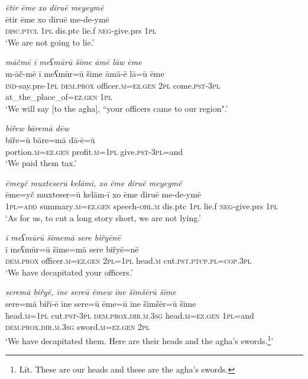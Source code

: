 \ea \label{BP.89}
\textit{ētir ēme xo diruē meyeymē} \\ 
\gll ētir ēme xo diruē me-de-ymē \\ 
 \textsc{disc.ptcl} \textsc{1pl} dis.ptc lie.f \textsc{neg-}give.prs \textsc{1pl} \\ 
\glt `We are not going to lie.'
\z 
 
\ea \label{BP.90}
\textit{māčmē ī meʕmūrū šime āmē lāw ēme} \\ 
\gll m-āč-mē ī meʕmūr=ū šime āmā-ē lā=ū ēme \\ 
 \textsc{ind-}say.prs\textsc{-\textsc{1pl}} \textsc{dem.prox} officer\textsc{.m}\textsc{=ez.gen} \textsc{2pl} come\textsc{.pst}\textsc{-3pl} at\_the\_place\_of\textsc{=ez.gen} \textsc{1pl} \\ 
\glt `We will say [to the agha], “your officers came to our region".'
\z 
 
\ea \label{BP.91}
\textit{biřew bāremā dēw} \\ 
\gll biře=ū bāre=mā dā-ē=ū \\ 
 portion\textsc{.m}\textsc{=ez.gen} profit\textsc{.m}\textsc{=\textsc{1pl}} give\textsc{.pst}\textsc{-3pl}=and \\ 
\glt `We paid them tax.'
\z 
 
\ea \label{BP.95}
\textit{ēmeyč muxteserū kelāmī, xo ēme diruē meyeymē} \\ 
\gll ēme=yč muxteser=ū kelām-ī xo ēme diruē me-de-ymē \\ 
 \textsc{1pl}\textsc{=add} summary\textsc{.m}\textsc{=ez.gen} speech\textsc{-obl}\textsc{.m} dis.ptc \textsc{1pl} lie.f \textsc{neg-}give.prs \textsc{1pl} \\ 
\glt `As for us, to cut a long story short, we are not lying.'
\z 
 
\ea \label{BP.96}
\textit{ī meʕmūrū šimemā sere biřyēnē} \\ 
\gll ī meʕmūr=ū šime=mā sere biřyē=nē \\ 
 \textsc{dem.prox} officer\textsc{.m}\textsc{=ez.gen} \textsc{2pl}\textsc{=\textsc{1pl}} head\textsc{.m} cut\textsc{.pst}\textsc{.ptcp}\textsc{.pl}\textsc{=cop}\textsc{.3pl} \\ 
\glt `We have decapitated your officers.'
\z 
 
\ea \label{BP.97}
\textit{seremā biřyē, īne sereū ēmew īne šimšērū šime} \\ 
\gll sere=mā biřī-ē īne sere=ū ēme=ū īne šimšēr=ū šime \\ 
 head\textsc{.m}\textsc{=\textsc{1pl}} cut\textsc{.pst}\textsc{-3pl} \textsc{dem.prox}\textsc{.dir}\textsc{.m}\textsc{.3sg} head\textsc{.m}\textsc{=ez.gen} \textsc{1pl}=and \textsc{dem.prox}\textsc{.dir}\textsc{.m}\textsc{.3sg} sword\textsc{.m}\textsc{=ez.gen} \textsc{2pl} \\ 
\glt `We have decapitated them. Here are their heads and the agha’s swords.\footnote{Lit. These are our heads and these are the agha’s swords.}'
\z 
 
